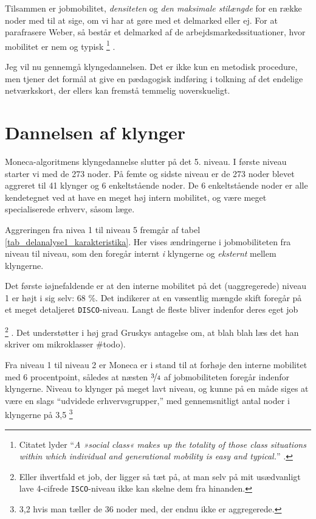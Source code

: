 Tilsammen er jobmobilitet, \emph{densiteten} og \emph{den maksimale stilængde} for en række noder med til at sige, om vi har at gøre med et delmarked eller ej. For at parafrasere Weber, så består et delmarked af de arbejdsmarkedssituationer, hvor mobilitet er nem og typisk 
%
\footnote{Citatet lyder “\emph{A »social class« makes up the totality of those class situations within which individual and generational mobility is easy and typical.}” \parencite[302]{Weber1978}.}%
%
\parencite[302]{Weber1978}. 

Jeg vil nu gennemgå klyngedannelsen. Det er ikke kun en metodisk procedure, men tjener det formål at give en pædagogisk indføring i tolkning af det endelige netværkskort, der ellers kan fremstå temmelig uoverskueligt. 

\section{Dannelsen af klynger \label{delanalyse1_segmenteringsprocessen}}

Moneca-algoritmens klyngedannelse slutter på det 5. niveau. I første niveau starter vi med de 273 noder. På femte og sidste niveau er de 273 noder blevet aggreret til 41 klynger og 6 enkeltstående noder. De 6 enkeltstående noder er alle kendetegnet ved at have en meget høj intern mobilitet, og være meget specialiserede erhverv, såsom læge. 


Aggreringen fra nivea 1 til niveau 5 fremgår af tabel \ref{tab_delanalyse1_karakteristika}. Her vises ændringerne i jobmobiliteten fra niveau til niveau, som den foregår internt \emph{i} klyngerne og \emph{eksternt} mellem klyngerne.

% 

% 

Det første iøjnefaldende er at den interne mobilitet på det (uaggregerede) niveau 1 er højt i sig selv: 68 \%. Det indikerer at en væsentlig mængde skift foregår på et meget detaljeret \texttt{DISCO}-niveau. Langt de fleste bliver indenfor deres eget job%
%

\footnote{Eller ihvertfald et job, der ligger så tæt på, at man selv på mit usædvanligt lave 4-cifrede \texttt{ISCO}-niveau ikke kan skelne dem fra hinanden.}%
%
. Det understøtter i høj grad Gruskys antagelse om, at blah blah læs det han skriver om mikroklasser \#todo). 

Fra niveau 1 til niveau 2 er Moneca er i stand til at forhøje den interne mobilitet med 6 procentpoint, således at næsten $\nicefrac{3}{4}$ af jobmobiliteten foregår indenfor klyngerne. Niveau to klynger på meget lavt niveau, og kunne på en måde siges at være en slags “udvidede erhvervsgrupper,” med gennemsnitligt antal noder i klyngerne på 3,5%
%
\footnote{ 3,2 hvis man tæller de 36 noder med, der endnu ikke er aggregerede.}%
%


